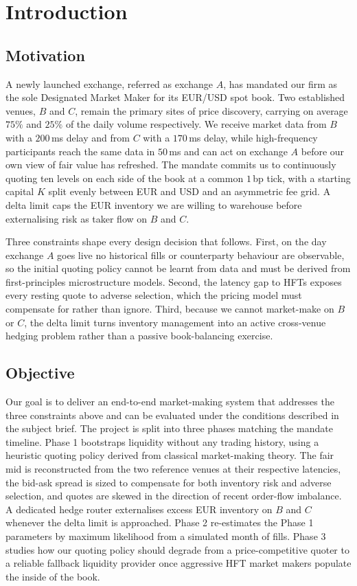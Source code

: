 \section{Introduction}
\label{sec:introduction}

\subsection{Motivation}
\label{sec:intro-motivation}

A newly launched exchange, referred as exchange
$A$, has mandated our firm as the sole Designated Market Maker for its
EUR/USD spot book. Two established venues, $B$ and $C$, remain the primary
sites of price discovery, carrying on average $75\%$ and $25\%$ of the daily
volume respectively. We receive market data from $B$ with a $200\,$ms delay
and from $C$ with a $170\,$ms delay, while high-frequency participants reach
the same data in $50\,$ms and can act on exchange $A$ before our own view of
fair value has refreshed. The mandate commits us to continuously quoting ten
levels on each side of the book at a common $1\,$bp tick, with a starting
capital $K$ split evenly between EUR and USD and an asymmetric fee grid. A delta limit caps the EUR inventory we are willing
to warehouse before externalising risk as taker flow on $B$ and $C$.

Three constraints shape every design decision that follows. First, on the
day exchange $A$ goes live no historical fills or counterparty behaviour are
observable, so the initial quoting policy cannot be learnt from data and
must be derived from first-principles microstructure models. Second, the
latency gap to HFTs exposes every resting quote to adverse selection, which
the pricing model must compensate for rather than ignore. Third, because we
cannot market-make on $B$ or $C$, the delta limit turns inventory management
into an active cross-venue hedging problem rather than a passive
book-balancing exercise.

\subsection{Objective}
\label{sec:intro-objective}

Our goal is to deliver an end-to-end market-making system that addresses the
three constraints above and can be evaluated under the conditions described
in the subject brief. The project is split into three phases matching the
mandate timeline. Phase 1 bootstraps liquidity without any trading history,
using a heuristic quoting policy derived from classical market-making
theory. The fair mid is reconstructed from the two reference venues at
their respective latencies, the bid-ask spread is sized to compensate for
both inventory risk and adverse selection, and quotes are skewed in the
direction of recent order-flow imbalance. A dedicated hedge router
externalises excess EUR inventory on $B$ and $C$ whenever the delta limit
is approached. Phase 2 re-estimates the Phase 1 parameters by maximum likelihood
from a simulated month of fills. Phase 3 studies how our quoting policy
should degrade from a price-competitive quoter to a reliable fallback
liquidity provider once aggressive HFT market makers populate the inside of
the book.


